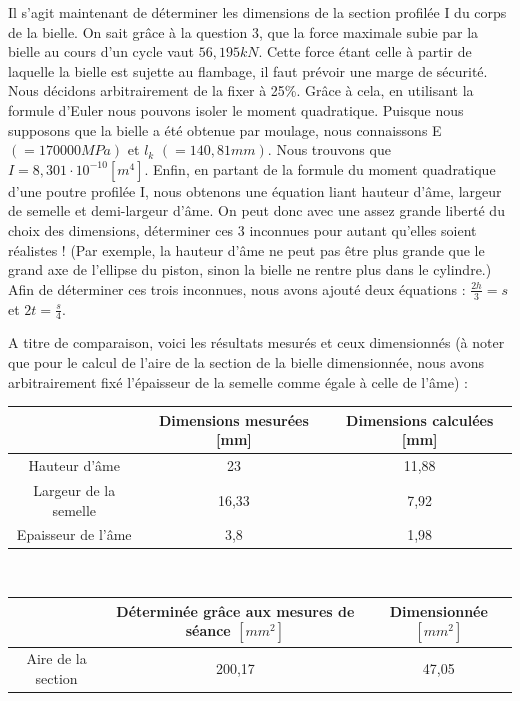 \documentclass[a4paper,oneside,11pt]{report}
\begin{document}
Il s'agit maintenant de déterminer les dimensions de la section profilée I du corps de la bielle. On sait grâce à la question 3, que la force maximale subie par la bielle au cours d'un cycle vaut $56,195 kN$. Cette force étant celle à partir de laquelle la bielle est sujette au flambage, il faut prévoir une marge de sécurité. Nous décidons arbitrairement de la fixer à 25\%. Grâce à cela, en utilisant la formule d'Euler nous pouvons isoler le moment quadratique. Puisque nous supposons que la bielle a été obtenue par moulage, nous connaissons E $(=170 000 MPa)$ et $l_k$ $(=140,81 mm)$. Nous trouvons que $I = 8,301 \cdot 10^{-10} [m^4]$. Enfin, en partant de la formule du moment quadratique d'une poutre profilée I, nous obtenons une équation liant hauteur d'âme, largeur de semelle et demi-largeur d'âme. On peut donc avec une assez grande liberté du choix des dimensions, déterminer ces 3 inconnues pour autant qu'elles soient réalistes ! (Par exemple, la hauteur d'âme ne peut pas être plus grande que le grand axe de l'ellipse du piston, sinon la bielle ne rentre plus dans le cylindre.)
Afin de déterminer ces trois inconnues, nous avons ajouté deux équations : $\frac{2h}{3} = s$ et $2t=\frac{s}{4}$.

A titre de comparaison, voici les résultats mesurés et ceux dimensionnés 
(à noter que pour le calcul de l'aire de la section de la bielle dimensionnée, nous avons arbitrairement fixé l'épaisseur de la semelle comme égale à celle de l'âme) :

\begin{center}
\begin{tabular}{|c||c|c|}
\hline 
\ & Dimensions mesurées [mm]  & Dimensions calculées [mm] \\ 
\hline 
Hauteur d'âme & 23 & 11,88 \\ 
\hline 
Largeur de la semelle & 16,33 & 7,92 \\ 
\hline 
Epaisseur de l'âme & 3,8 & 1,98 \\
\hline
\end{tabular} \\
\end{center}

\begin{center}
\begin{tabular}{|c||c|c|}
\hline 
\ & Déterminée grâce aux mesures de séance $[mm^2]$ & Dimensionnée $[mm^2]$ \\
\hline
Aire de la section & 200,17  &  47,05 \\
\hline
\end{tabular} \\
\end{center}
\end{document}
